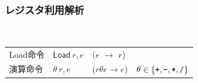 \documentclass[ckj,dvipdfmx]{beamer}
\begin{document}
\begin{frame}[fragile]
  \frametitle{レジスタ利用解析}
  \\

  \vspace*{3mm}


  \vspace*{3mm}

  \begin{tabular}{llll}
  Load命令 & $\mathsf{Load}\ r,e$ & ($e$ $\rightarrow$ $r$)\\[5pt]
  演算命令 & $\theta\ r,e$ & ($r\theta e\rightarrow e$) & $\theta\in\{\texttt{+},\texttt{-},\texttt{*},\texttt{/}\}$
  \end{tabular}

  \vspace*{5mm}


\end{frame}
\end{document}
